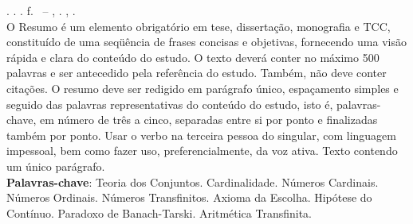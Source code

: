 
\begin{resumo}[RESUMO]
    \begin{SingleSpacing}

        \imprimirautorcitacao. \imprimirtitulo. \imprimirdata. \pageref {LastPage} f. \imprimirprojeto\ – \imprimirprograma, \imprimirinstituicao. \imprimirlocal, \imprimirdata.\\

        O Resumo é um elemento obrigatório em tese, dissertação, monografia e TCC, constituído de uma seqüência de frases concisas e objetivas, fornecendo uma visão rápida e clara do conteúdo do estudo. O texto deverá conter no máximo 500 palavras e ser antecedido
        pela referência do estudo. Também, não deve conter citações. O resumo deve ser redigido em parágrafo único, espaçamento simples e seguido das palavras representativas do conteúdo do estudo, isto é, palavras-chave, em número de três a cinco, separadas entre si por ponto e finalizadas também por ponto. Usar o verbo na terceira pessoa do singular, com linguagem impessoal, bem como fazer uso, preferencialmente, da voz ativa. Texto contendo um único parágrafo.\\

        \textbf{Palavras-chave}: Teoria dos Conjuntos. Cardinalidade. Números Cardinais. Números Ordinais. Números Transfinitos. Axioma da Escolha. Hipótese do Contínuo. Paradoxo de Banach-Tarski. Aritmética Transfinita.

    \end{SingleSpacing}
\end{resumo}



